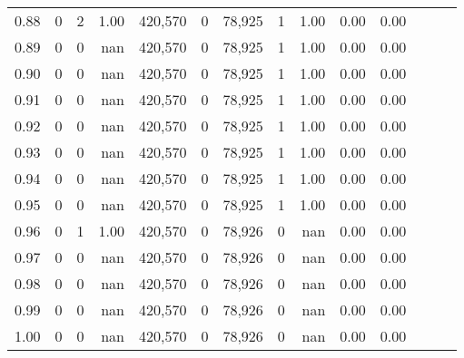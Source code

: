 \begin{tabular}{rrrrrrrrrrrrrr}
0.88 &       0 &      2 &  1.00 &  420,570 &        0 &  78,925 &       1 &  1.00 &  0.00 &      0.00 \\
0.89 &       0 &      0 &   nan &  420,570 &        0 &  78,925 &       1 &  1.00 &  0.00 &      0.00 \\
0.90 &       0 &      0 &   nan &  420,570 &        0 &  78,925 &       1 &  1.00 &  0.00 &      0.00 \\
0.91 &       0 &      0 &   nan &  420,570 &        0 &  78,925 &       1 &  1.00 &  0.00 &      0.00 \\
0.92 &       0 &      0 &   nan &  420,570 &        0 &  78,925 &       1 &  1.00 &  0.00 &      0.00 \\
0.93 &       0 &      0 &   nan &  420,570 &        0 &  78,925 &       1 &  1.00 &  0.00 &      0.00 \\
0.94 &       0 &      0 &   nan &  420,570 &        0 &  78,925 &       1 &  1.00 &  0.00 &      0.00 \\
0.95 &       0 &      0 &   nan &  420,570 &        0 &  78,925 &       1 &  1.00 &  0.00 &      0.00 \\
0.96 &       0 &      1 &  1.00 &  420,570 &        0 &  78,926 &       0 &   nan &  0.00 &      0.00 \\
0.97 &       0 &      0 &   nan &  420,570 &        0 &  78,926 &       0 &   nan &  0.00 &      0.00 \\
0.98 &       0 &      0 &   nan &  420,570 &        0 &  78,926 &       0 &   nan &  0.00 &      0.00 \\
0.99 &       0 &      0 &   nan &  420,570 &        0 &  78,926 &       0 &   nan &  0.00 &      0.00 \\
1.00 &       0 &      0 &   nan &  420,570 &        0 &  78,926 &       0 &   nan &  0.00 &      0.00 \\
\bottomrule
\end{tabular}
